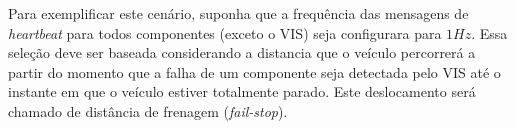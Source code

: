 \documentclass[conference]{IEEEtran}
\begin{document}



Para exemplificar este cenário, suponha que a frequência das mensagens de \textit{heartbeat} para todos componentes (exceto o VIS) seja configurara para $1Hz$. Essa seleção deve ser baseada considerando a distancia que o veículo percorrerá a partir do momento que a falha de um componente seja detectada pelo VIS até o instante em que o veículo estiver totalmente parado. Este deslocamento será chamado de distância de frenagem (\textit{fail-stop}).
\end{document}
